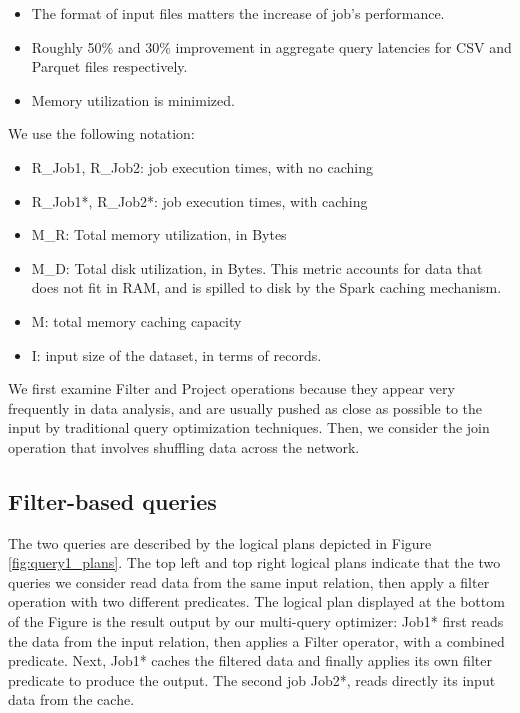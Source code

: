 \begin{itemize}
	\item The format of input files matters the increase of job's performance.
	\item Roughly 50\% and 30\% improvement in aggregate query latencies for CSV and Parquet files respectively.
	\item Memory utilization is minimized.
\end{itemize}

We use the following notation:
\begin{itemize}
	\item R\_Job1, R\_Job2: job execution times, with no caching
	\item R\_Job1*, R\_Job2*: job execution times, with caching
	\item M\_R: Total memory utilization, in Bytes
	\item M\_D: Total disk utilization, in Bytes. This metric accounts for data that does not fit in RAM, and is spilled to disk by the Spark caching mechanism.
	\item M: total memory caching capacity
	\item I: input size of the dataset, in terms of records.
\end{itemize}

We first examine Filter and Project operations because they appear very frequently in data analysis, and are usually pushed as close as possible to the input by traditional query optimization techniques. Then, we consider the join operation that involves shuffling data across the network.

\subsection{Filter-based queries}
The two queries are described by the logical plans depicted in Figure \ref{fig:query1_plans}. The top left and top right logical plans indicate that the two queries we consider read data from the same input relation, then apply a filter operation with two different predicates. The logical plan displayed at the bottom of the Figure is the result output by our multi-query optimizer: Job1* first reads the data from the input relation, then applies a Filter operator, with a combined predicate. Next, Job1* caches the filtered data and finally applies its own filter predicate to produce the output. The second job Job2*, reads directly its input data from the cache.

